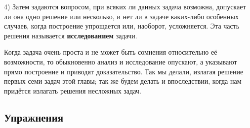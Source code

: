 \documentclass[twoside]{book}
\begin{document}
4) Затем задаются вопросом, при всяких ли данных задача возможна, допускает ли она одно решение или несколько, и нет ли в задаче каких-либо особенных случаев, когда построение упрощается или, наоборот, усложняется.
Эта часть решения называется \textbf{исследованием} задачи.

Когда задача очень проста и не может быть сомнения относительно её возможности, то обыкновенно анализ и исследование опускают, а указывают прямо построение и приводят доказательство.
Так мы делали, излагая решение первых семи задач этой главы;
так же будем делать и впоследствии, когда нам придётся излагать решения несложных задач.

\subsection*{Упражнения}

\begin{center}
\end{center}
\end{document}
